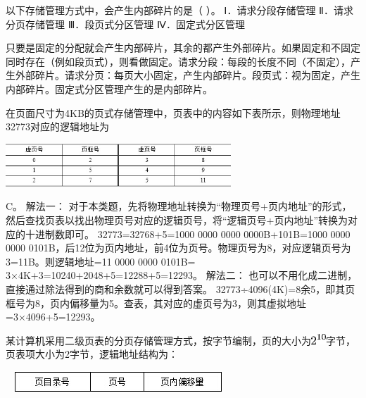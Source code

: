 \question 以下存储管理方式中，会产生内部碎片的是（ ）。 Ⅰ．请求分段存储管理
Ⅱ．请求分页存储管理 Ⅲ．段页式分区管理 Ⅳ．固定式分区管理
\par{}
\begin{solution}只要是固定的分配就会产生内部碎片，其余的都产生外部碎片。如果固定和不固定同时存在（例如段页式），则看做固定。请求分段：每段的长度不同（不固定），产生外部碎片。请求分页：每页大小固定，产生内部碎片。段页式：视为固定，产生内部碎片。固定式分区管理产生的是内部碎片。
\end{solution}
\question 在页面尺寸为4KB的页式存储管理中，页表中的内容如下表所示，则物理地址32773对应的逻辑地址为

\includegraphics[width=3.33333in,height=0.63542in]{computerassets/b8801163b984bb0c1ef76b265a03fe84.jpeg}
\par{}
\begin{solution}C。 解法一：
对于本类题，先将物理地址转换为``物理页号+页内地址''的形式，然后查找页表以找出物理页号对应的逻辑页号，将``逻辑页号+页内地址''转换为对应的十进制数即可。
32773=32768+5=1000 0000 0000 0000B+101B=1000 0000 0000
0101B，后12位为页内地址，前4位为页号。物理页号为8，对应逻辑页号为3=11B。则逻辑地址=11
0000 0000 0101B= 3×4K+3=10240+2048+5=12288+5=12293。 解法二：
也可以不用化成二进制，直接通过除法得到的商和余数就可以得到答案。
32773÷4096(4K)=8余5，即其页框号为8，页内偏移量为5。查表，其对应的虚页号为3，则其虚拟地址=3×4096+5=12293。
\end{solution}
\question 某计算机采用二级页表的分页存储管理方式，按字节编制，页的大小为\includegraphics[width=0.21875in,height=0.15625in]{texmath/e0c3285Cdpi7B3507D25E7B107D}字节，页表项大小为2字节，逻辑地址结构为：

~
\includegraphics[width=3.08333in,height=0.31250in]{computerassets/caeb37c4933000ccb425f21fe0f14b7d.jpeg}~

